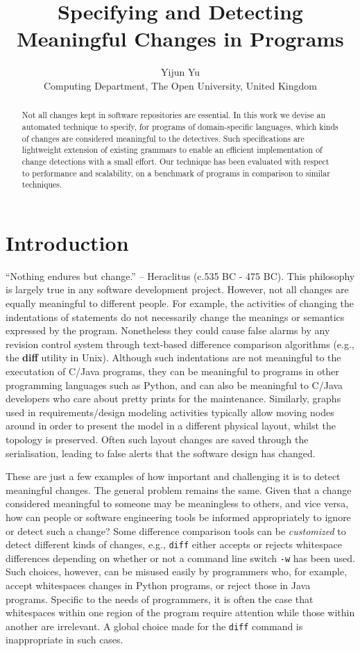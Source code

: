 \documentclass{acm_proc_article-sp}
\title{Specifying and Detecting Meaningful Changes in Programs}
\author{
   \begin{tabular}{c}
   Yijun Yu \\
   Computing Department, The Open University, United Kingdom
   \end{tabular}
}
\begin{document}
\maketitle
\begin{abstract}
Not all changes kept in software repositories are essential. In this work we devise an automated technique to specify, for programs of domain-specific languages, which kinds of changes are considered meaningful to the detectives. Such specifications are lightweight extension of existing grammars to enable an efficient implementation of change detections with a small effort. Our technique has been evaluated with respect to performance and scalability, on a benchmark of programs in comparison to similar techniques. 
\end{abstract}
\section{Introduction}

``Nothing endures but change.'' -- Heraclitus (c.535 BC - 475 BC). This philosophy is largely true in any software development project.
However, not all changes are equally meaningful to different people. For example, the activities of changing the indentations of statements do not necessarily change the meanings or semantics expressed by the program. Nonetheless they could cause false alarms by any revision control system through text-based difference comparison algorithms (e.g., the {\bf diff} utility in Unix). Although such indentations are not meaningful to the executation of C/Java programs, they can be meaningful to programs in other programming languages such as Python, and can also be meaningful to C/Java developers who care about pretty prints for the maintenance. Similarly, graphs used in requirements/design modeling activities typically allow moving nodes around in order to present the model in a different physical layout, whilst the topology is preserved. Often such layout changes are saved through the serialisation, leading to false alerts that the software design has changed. 

These are just a few examples of how important and challenging it is to detect meaningful changes. The general problem remains the same. Given that a change considered meaningful to someone may be meaningless to others, and vice versa, how can people or software engineering tools be informed appropriately to ignore or detect such a change? Some difference comparison tools can be {\em customized} to detect different kinds of changes, e.g., {\tt diff} either accepts or rejects whitespace differences depending on whether or not a command line switch {\tt -w} has been used. Such choices, however, can be misused easily by programmers who, for example, accept whitespaces changes in Python programs, or reject those in Java programs. Specific to the needs of programmers, it is often the case that whitespaces within one region of the program require attention while those within another are irrelevant. A global choice made for the {\tt diff} command is inappropriate in such cases. 
\end{document}
